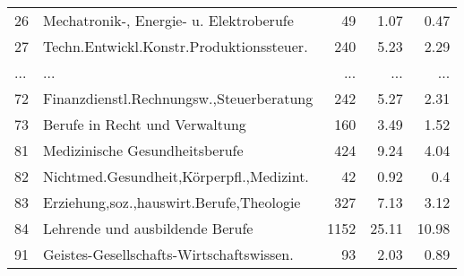 \begin{longtable}{lXrrr}
        26 & \multicolumn{1}{X}{Mechatronik-, Energie- u. Elektroberufe} & %
          \num{49} &
          \num[round-mode=places,round-precision=2]{1,07} &
          \num[round-mode=places,round-precision=2]{0,47} \\
        27 & \multicolumn{1}{X}{Techn.Entwickl.Konstr.Produktionssteuer.} & %
          \num{240} &
          \num[round-mode=places,round-precision=2]{5,23} &
          \num[round-mode=places,round-precision=2]{2,29} \\
       ... & ... & ... & ... & ... \\
        72 & \multicolumn{1}{X}{Finanzdienstl.Rechnungsw.,Steuerberatung} & %
          \num{242} &
          \num[round-mode=places,round-precision=2]{5,27} &
          \num[round-mode=places,round-precision=2]{2,31} \\

        73 & \multicolumn{1}{X}{Berufe in Recht und Verwaltung} & %
          \num{160} &
          \num[round-mode=places,round-precision=2]{3,49} &
          \num[round-mode=places,round-precision=2]{1,52} \\

        81 & \multicolumn{1}{X}{Medizinische Gesundheitsberufe} & %
          \num{424} &
          \num[round-mode=places,round-precision=2]{9,24} &
          \num[round-mode=places,round-precision=2]{4,04} \\

        82 & \multicolumn{1}{X}{Nichtmed.Gesundheit,Körperpfl.,Medizint.} & %
          \num{42} &
          \num[round-mode=places,round-precision=2]{0,92} &
          \num[round-mode=places,round-precision=2]{0,4} \\

        83 & \multicolumn{1}{X}{Erziehung,soz.,hauswirt.Berufe,Theologie} & %
          \num{327} &
          \num[round-mode=places,round-precision=2]{7,13} &
          \num[round-mode=places,round-precision=2]{3,12} \\

        84 & \multicolumn{1}{X}{Lehrende und ausbildende Berufe} & %
          \num{1152} &
          \num[round-mode=places,round-precision=2]{25,11} &
          \num[round-mode=places,round-precision=2]{10,98} \\

        91 & \multicolumn{1}{X}{Geistes-Gesellschafts-Wirtschaftswissen.} & %
          \num{93} &
          \num[round-mode=places,round-precision=2]{2,03} &
          \num[round-mode=places,round-precision=2]{0,89} \\


\end{longtable}
